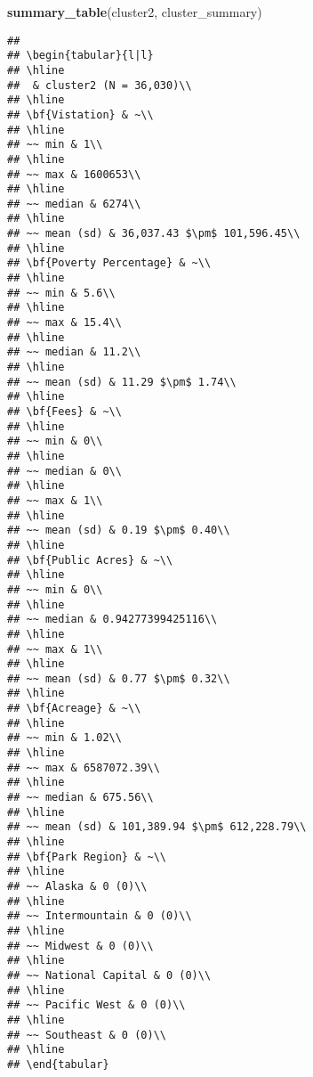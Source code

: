 \documentclass[
]{article}
\newenvironment{Shaded}{\begin{snugshade}}{\end{snugshade}}
\newcommand{\KeywordTok}[1]{\textcolor[rgb]{0.13,0.29,0.53}{\textbf{#1}}}
\newcommand{\NormalTok}[1]{#1}
\begin{document}
\begin{Shaded}
\begin{Highlighting}[]
\KeywordTok{summary_table}\NormalTok{(cluster2, cluster_summary)}
\end{Highlighting}
\end{Shaded}

\begin{verbatim}
## 
## \begin{tabular}{l|l}
## \hline
##  & cluster2 (N = 36,030)\\
## \hline
## \bf{Vistation} & ~\\
## \hline
## ~~ min & 1\\
## \hline
## ~~ max & 1600653\\
## \hline
## ~~ median & 6274\\
## \hline
## ~~ mean (sd) & 36,037.43 $\pm$ 101,596.45\\
## \hline
## \bf{Poverty Percentage} & ~\\
## \hline
## ~~ min & 5.6\\
## \hline
## ~~ max & 15.4\\
## \hline
## ~~ median & 11.2\\
## \hline
## ~~ mean (sd) & 11.29 $\pm$ 1.74\\
## \hline
## \bf{Fees} & ~\\
## \hline
## ~~ min & 0\\
## \hline
## ~~ median & 0\\
## \hline
## ~~ max & 1\\
## \hline
## ~~ mean (sd) & 0.19 $\pm$ 0.40\\
## \hline
## \bf{Public Acres} & ~\\
## \hline
## ~~ min & 0\\
## \hline
## ~~ median & 0.94277399425116\\
## \hline
## ~~ max & 1\\
## \hline
## ~~ mean (sd) & 0.77 $\pm$ 0.32\\
## \hline
## \bf{Acreage} & ~\\
## \hline
## ~~ min & 1.02\\
## \hline
## ~~ max & 6587072.39\\
## \hline
## ~~ median & 675.56\\
## \hline
## ~~ mean (sd) & 101,389.94 $\pm$ 612,228.79\\
## \hline
## \bf{Park Region} & ~\\
## \hline
## ~~ Alaska & 0 (0)\\
## \hline
## ~~ Intermountain & 0 (0)\\
## \hline
## ~~ Midwest & 0 (0)\\
## \hline
## ~~ National Capital & 0 (0)\\
## \hline
## ~~ Pacific West & 0 (0)\\
## \hline
## ~~ Southeast & 0 (0)\\
## \hline
## \end{tabular}
\end{verbatim}
\end{document}
